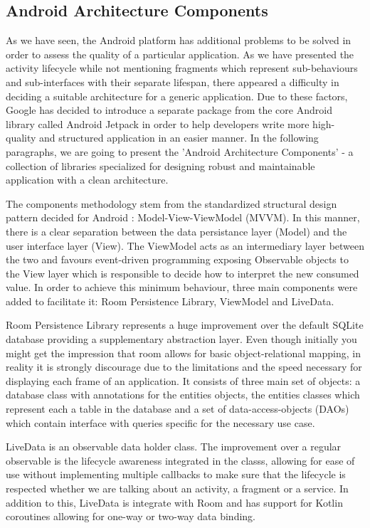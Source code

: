 \subsection*{Android Architecture Components}

As we have seen, the Android platform has additional problems to be solved in order to assess the quality of a particular application. As we have presented the activity lifecycle while not mentioning fragments which represent sub-behaviours and sub-interfaces with their separate lifespan, there appeared a difficulty in deciding a suitable architecture for a generic application. Due to these factors, Google has decided to introduce a separate package from the core Android library called Android Jetpack in order to help developers write more high-quality and structured application in an easier manner. In the following paragraphs, we are going to present the 'Android Architecture Components' - a collection of libraries specialized for designing robust and maintainable application with a clean architecture.

The components methodology stem from the standardized structural design pattern decided for Android : Model-View-ViewModel (MVVM). In this manner, there is a clear separation between the data persistance layer (Model) and the user interface layer (View). The ViewModel acts as an intermediary layer between the two and favours event-driven programming exposing Observable objects to the View layer which is responsible to decide how to interpret the new consumed value. In order to achieve this minimum behaviour, three main components were added to facilitate it: Room Persistence Library, ViewModel and LiveData.

Room Persistence Library represents a huge improvement over the default SQLite database providing a supplementary abstraction layer. Even though initially you might get the impression that room allows for basic object-relational mapping, in reality it is strongly discourage due to the limitations and the speed necessary for displaying each frame of an application. It consists of three main set of objects: a database class with annotations for the entities objects, the entities classes which represent each a table in the database and a set of data-access-objects (DAOs) which contain interface with queries specific for the necessary use case. 

LiveData is an observable data holder class. The improvement over a regular observable is the lifecycle awareness integrated in the classs, allowing for ease of use without implementing multiple callbacks to make sure that the lifecycle is respected whether we are talking about an activity, a fragment or a service. In addition to this, LiveData is integrate with Room and has support for Kotlin coroutines allowing for one-way or two-way data binding.

